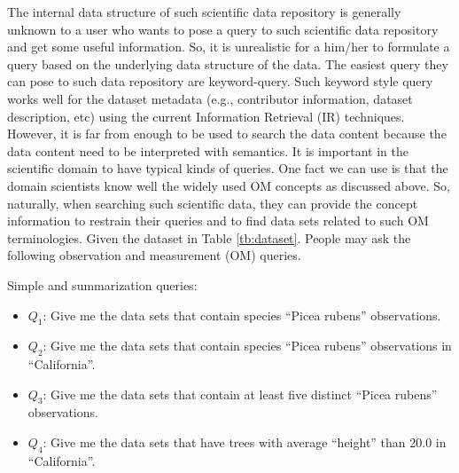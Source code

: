 The internal data structure of such scientific data repository is
generally unknown to a user who wants to pose a query to such scientific data
repository and get some useful information. 
So, it is unrealistic for a him/her to formulate a query based on the 
underlying data structure of the data.  
The easiest query they can pose to such data repository are keyword-query. 
Such keyword style query works well for the dataset metadata
(e.g., contributor information, dataset description, etc) using the
current Information Retrieval (IR) techniques. However, it
is far from enough to be used to search the data content because the
data content need to be interpreted with semantics. 
It is important in the scientific domain to have typical
kinds of queries. One fact we can use is that the domain
scientists know well the widely used OM concepts as discussed above. 
So, naturally, when searching such scientific data, they can provide
the concept information to restrain their queries and to find data sets
related to such OM terminologies. 
Given the dataset in Table \ref{tb:dataset}. 
People may ask the following observation and measurement (OM) queries. 

\begin{example}\label{eg:query}
Simple and summarization queries: 
\begin{itemize}
\item $Q_1$: Give me the data sets that contain species ``Picea rubens'' observations.
\item $Q_2$: Give me the data sets that contain species ``Picea rubens''
  observations in ``California''. 
\item $Q_3$: Give me the data sets that contain at least five distinct
  ``Picea rubens'' observations.
\item $Q_4$: Give me the data sets that have trees with average ``height''
  than 20.0 in ``California''. 
\end{itemize}
\end{example}


